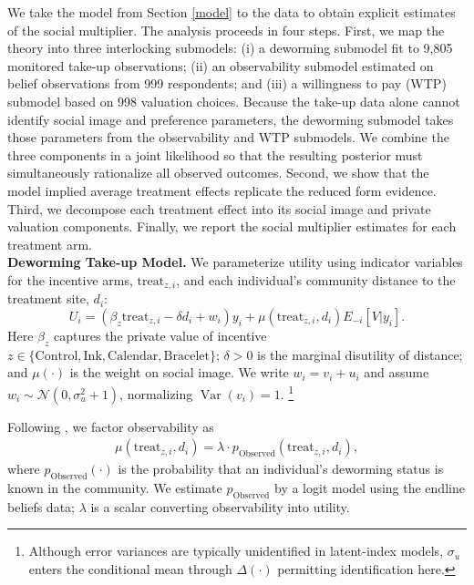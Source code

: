 \documentclass[12pt,a4paper]{article}
\begin{document}
We take the model from Section \ref{model} to the data to obtain explicit estimates of the social multiplier. The analysis proceeds in four steps. First, we map the theory into three interlocking submodels: (i) a deworming submodel fit to 9,805 monitored take‑up observations; (ii) an observability submodel estimated on belief observations from 999 respondents; and (iii) a willingness to pay (WTP) submodel based on 998 valuation choices. Because the take‑up data alone cannot identify social image and preference parameters, the deworming submodel takes those parameters from the observability and WTP submodels. We combine the three components in a joint likelihood so that the resulting posterior must simultaneously rationalize all observed outcomes. Second, we show that the model implied average treatment effects replicate the reduced form evidence. Third, we decompose each treatment effect into its social image and private valuation components. Finally, we report the social multiplier estimates for each treatment arm. \\

\textbf{Deworming Take-up Model.} We parameterize utility using indicator variables for the incentive arms, \(\text{treat}_{z,i}\), and each individual's community distance to the treatment site, \(d_i\):
\begin{equation}
U_i = (\beta_z \textrm{treat}_{z,i} - \delta d_i + w_i)y_i  +  \mu(\textrm{treat}_{z,i}, d_i) E_{-i}[V | y_i].
\label{eq:struct-utility}
\end{equation} 
Here \(\beta_z\) captures the private value of incentive \(z\in\{\text{Control},\text{Ink},\text{Calendar},\text{Bracelet}\}\);  \(\delta>0\) is the marginal disutility of distance; and \(\mu(\cdot)\) is the weight on social image.  We write \(w_i=v_i+u_i\) and assume \(w_i\sim\mathcal N(0,\sigma_u^{2}+1)\), normalizing \(\operatorname{Var}(v_i)=1\).%
\footnote{Although error variances are typically unidentified in latent-index models, \(\sigma_u\) enters the conditional mean through \(\Delta(\cdot)\) permitting identification here.}

Following \citet{Benabou_laws_2011}, we factor observability as
\begin{align*}
\mu(\textrm{treat}_{z,i}, d_i) = \lambda \cdot p_{\textrm{Observed}}(\textrm{treat}_{z,i}, d_i),    
\end{align*}
where \(p_{\text{Observed}}(\cdot)\) is the probability that an individual’s deworming status is known in the community. We estimate \(p_{\text{Observed}}\) by a logit model using the endline beliefs data; \(\lambda\) is a scalar converting observability into utility. 
\end{document}
